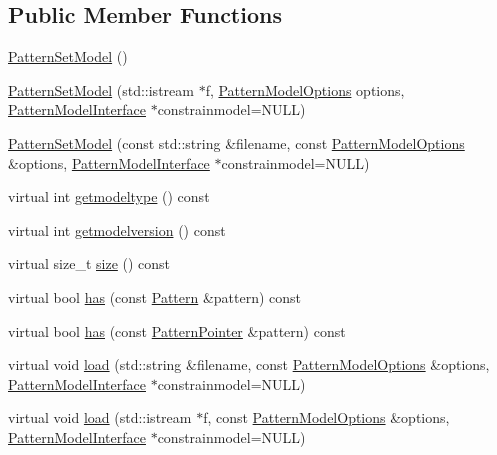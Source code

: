 \subsection*{Public Member Functions}
\begin{DoxyCompactItemize}
\item 
\hyperlink{classPatternSetModel_a983877848beaf832f41f747231e1bf6f}{Pattern\+Set\+Model} ()
\item 
\hyperlink{classPatternSetModel_aecf0741defc687aff8e69514742c697d}{Pattern\+Set\+Model} (std\+::istream $\ast$f, \hyperlink{classPatternModelOptions}{Pattern\+Model\+Options} options, \hyperlink{classPatternModelInterface}{Pattern\+Model\+Interface} $\ast$constrainmodel=N\+U\+L\+L)
\item 
\hyperlink{classPatternSetModel_a31c7d5c3e0165fa832d8fc85f292bd1e}{Pattern\+Set\+Model} (const std\+::string \&filename, const \hyperlink{classPatternModelOptions}{Pattern\+Model\+Options} \&options, \hyperlink{classPatternModelInterface}{Pattern\+Model\+Interface} $\ast$constrainmodel=N\+U\+L\+L)
\item 
virtual int \hyperlink{classPatternSetModel_a27adf3033f15f03e908d53d032779d09}{getmodeltype} () const 
\item 
virtual int \hyperlink{classPatternSetModel_a79dc7fd04e3de5eb894541bd664f5d12}{getmodelversion} () const 
\item 
virtual size\+\_\+t \hyperlink{classPatternSetModel_aa19ae308dbc4bf1db35be6ba7ff4769b}{size} () const 
\item 
virtual bool \hyperlink{classPatternSetModel_a8821cf7c6d469d0978e32e5ed9cfcda0}{has} (const \hyperlink{classPattern}{Pattern} \&pattern) const 
\item 
virtual bool \hyperlink{classPatternSetModel_a2fcd4d3d1023b5e20f67d2b845a29b2f}{has} (const \hyperlink{classPatternPointer}{Pattern\+Pointer} \&pattern) const 
\item 
virtual void \hyperlink{classPatternSetModel_af6c3d508fd01352eeb3ae90c438db24b}{load} (std\+::string \&filename, const \hyperlink{classPatternModelOptions}{Pattern\+Model\+Options} \&options, \hyperlink{classPatternModelInterface}{Pattern\+Model\+Interface} $\ast$constrainmodel=N\+U\+L\+L)
\item 
virtual void \hyperlink{classPatternSetModel_a61c9e25adefa734946a7571a0444049f}{load} (std\+::istream $\ast$f, const \hyperlink{classPatternModelOptions}{Pattern\+Model\+Options} \&options, \hyperlink{classPatternModelInterface}{Pattern\+Model\+Interface} $\ast$constrainmodel=N\+U\+L\+L)

\end{DoxyCompactItemize}
